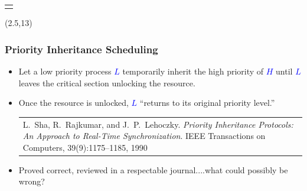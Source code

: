 \documentclass[dvipsnames,14pt,t]{beamer}
\newcommand{\bl}[1]{\textcolor{blue}{#1}}
\begin{document}
\begin{frame}[c]
\begin{textblock}{11}
\begin{tabular}{@{\hspace{-10mm}}l}
\begin{tikzpicture}[scale=1.1]
  \end{tikzpicture}
  \end{tabular}
  \end{textblock}

  \begin{textblock}{0}(2.5,13)%
  \small
  \end{textblock}

  \end{frame}
  
  \begin{frame}[c]
  \frametitle{\Large Priority Inheritance Scheduling}

  \begin{itemize}
  \item Let a low priority process \bl{$L$} temporarily inherit 
    the high priority of \bl{$H$} until \bl{$L$} leaves the critical 
    section unlocking the resource.\bigskip
  \item Once the resource is unlocked, \bl{$L$} ``returns to its original 
    priority level.''\\
    \mbox{}\hfill\footnotesize
    \begin{tabular}{p{6cm}@{}}
    L.~Sha, R.~Rajkumar, and J.~P.~Lehoczky. 
    {\it Priority Inheritance Protocols: An Approach to 
    Real-Time Synchronization}. IEEE Transactions on 
    Computers, 39(9):1175–1185, 1990
    \end{tabular}\bigskip\normalsize\pause
  
  \item Proved correct, reviewed in a respectable journal....what could possibly be wrong?
    
  \end{itemize}

  \end{frame}
  
\end{document}
